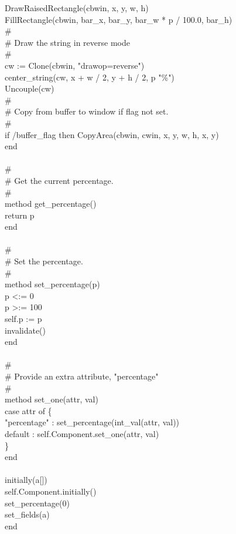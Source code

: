 {\>\>DrawRaisedRectangle(cbwin, x, y, w, h) \\
\>\>FillRectangle(cbwin, bar\_x, bar\_y, bar\_w * p / 100.0, bar\_h) \\
\>\>\# \\
\>\>\# Draw the string in reverse mode \\
\>\>\# \\
\>\>cw := Clone(cbwin, "drawop=reverse") \\
\>\>center\_string(cw, x + w / 2, y + h / 2, p {\textbar}{\textbar} "\%") \\
\>\>Uncouple(cw) \\
\>\>\# \\
\>\>\# Copy from buffer to window if flag not set. \\
\>\>\# \\
\>\>if /buffer\_flag then CopyArea(cbwin, cwin, x, y, w, h, x, y) \\
\>end \\
\ \\
\>\# \\
\>\# Get the current percentage. \\
\>\# \\
\>method get\_percentage() \\
\>\>return p \\
\>end \\
\ \\
\>\# \\
\>\# Set the percentage. \\
\>\# \\
\>method set\_percentage(p) \\
\>\>p {\textless}:= 0 \\
\>\>p {\textgreater}:= 100 \\
\>\>self.p := p \\
\>\>invalidate() \\
\>end \\
\ \\
\>\# \\
\>\# Provide an extra attribute, "percentage" \\
\>\# \\
\>method set\_one(attr, val) \\
\>\>case attr of \{ \\
\>\>\>"percentage" : set\_percentage(int\_val(attr, val)) \\
\>\>\>default : self.Component.set\_one(attr, val) \\
\>\>\>\} \\
\>end \\
\ \\
initially(a[]) \\
\>self.Component.initially() \\
\>set\_percentage(0) \\
\>set\_fields(a) \\
end \\
}

